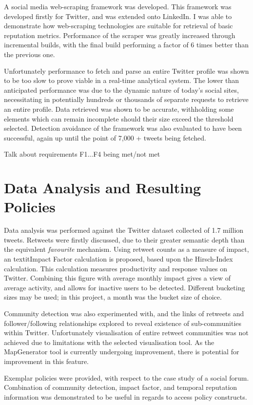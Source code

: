 A social media web-scraping framework was developed. This framework was developed firstly for Twitter, and was extended onto LinkedIn. I was able to demonstrate how web-scraping technologies are suitable for retrieval of basic reputation metrics. Performance of the scraper was greatly increased through incremental builds, with the final build performing a factor of 6 times better than the previous one.

Unfortunately performance to fetch and parse an entire Twitter profile was shown to be too slow to prove viable in a real-time analytical system. The lower than anticipated performance was due to the dynamic nature of today's social sites, necessitating in potentially hundreds or thousands of separate requests to retrieve an entire profile. Data retrieved was shown to be accurate, withholding some elements which can remain incomplete should their size exceed the threshold selected. Detection avoidance of the framework was also evaluated to have been successful, again up until the point of 7,000 + tweets being fetched. 

Talk about requirements F1...F4 being met/not met

\section{Data Analysis and Resulting Policies}

Data analysis was performed against the Twitter dataset collected of 1.7 million tweets. Retweets were firstly discussed, due to their greater semantic depth than the equivalent \textit{favourite} mechanism. Using retweet counts as a measure of impact, an textit{Impact Factor} calculation is proposed, based upon the Hirsch-Index calculation. This calculation measures productivity and response values on Twitter. Combining this figure with average monthly impact gives a view of average activity, and allows for inactive users to be detected. Different bucketing sizes may be used; in this project, a month was the bucket size of choice. 

Community detection was also experimented with, and the links of retweets and follower/following relationships explored to reveal existence of sub-communities within Twitter. Unfortunately visualisation of entire retweet communities was not achieved due to limitations with the selected visualisation tool. As the MapGenerator tool is currently undergoing improvement, there is potential for improvement in this feature.

Exemplar policies were provided, with respect to the case study of a social forum. Combination of community detection, impact factor, and temporal reputation information was demonstrated to be useful in regards to access policy constructs. 

